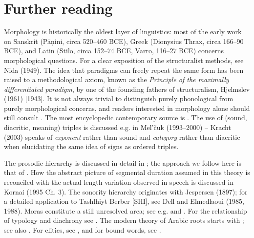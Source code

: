 \section{Further reading}

Morphology is historically the oldest layer of linguistics: most of the early
work on Sanskrit (P\={a}\d{n}ini, circa 520--460 BCE), Greek (Dionysius Thrax,
circa 166--90 BCE), and Latin (Stilo, circa 152--74 BCE, Varro, 116--27 BCE)
concerns morphological questions.  For a clear exposition of the structuralist
methods, see Nida (1949). The idea that paradigms can freely repeat the same
form has been raised to a methodological axiom, known as the {\it Principle of
  the maximally differentiated paradigm}, by one of the founding fathers of
structuralism, Hjelmslev (1961) [1943].  It is not always trivial to
distinguish purely phonological from purely morphological concerns, and
readers interested in morphology alone should still consult
. The most encyclopedic contemporary source is
.  The use of (sound, diacritic, meaning) triples is
discussed e.g. in Mel'\v{c}uk (1993--2000) -- Kracht (2003) speaks of {\it
  exponent} rather than sound and {\it category} rather than diacritic when
elucidating the same idea of signs as ordered triples. 
\nocite{Nida:1949}
\nocite{Hjelmslev:1961} \nocite{Melcuk:1993}

The prosodic hierarchy is discussed in detail in ; the
approach we follow here is that of .  How the abstract
picture of segmental duration assumed in this theory is reconciled with the
actual length variation observed in speech is discussed in Kornai (1995 
Ch. 3).  The sonority hierarchy originates with Jespersen (1897); for a
detailed application to Tashlhiyt Berber [SHI], see Dell and Elmedlaoui (1985,
1988).  \nocite{Dell:1985} \nocite{Dell:1988} Moras constitute a still
unresolved area; see e.g.   and .
\nocite{Wilkinson:1988} \nocite{Jespersen:1897} For the relationship of
typology and diachrony see . The modern theory of Arabic
roots starts with ; see also . For
clitics, see , and for bound words, see
.

